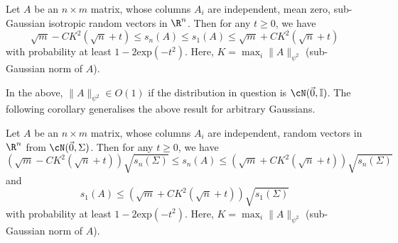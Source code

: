 \begin{lemma}\label{lem:sub-gaussian-spectrum}
    Let $A$ be an $n \times m$ matrix, whose columns $A_i$
    are independent, mean zero, sub-Gaussian isotropic
    random vectors in $\R^n$. Then for any $t \geq 0$,
    we have
    $$\sqrt{m} - CK^2(\sqrt{n}+t) \leq s_n(A) \leq
        s_1(A) \leq \sqrt{m} + CK^2(\sqrt{n}+t)$$
    with probability at least $1-2\mathrm{exp}(-t^2)$.
    Here, $K = \max_i\|A\|_{\psi^2}$ (sub-Gaussian norm
    of $A$).
\end{lemma}

In the above, $\|A\|_{\psi^2} \in O(1)$ if the distribution
in question is $\cN(\vec{0},\id)$. The following corollary
generalises the above result for arbitrary Gaussians.

\begin{corollary}\label{coro:normal-spectrum}
    Let $A$ be an $n \times m$ matrix, whose columns $A_i$
    are independent, random vectors in $\R^n$ from $\cN(\vec{0},\Sigma)$.
    Then for any $t \geq 0$, we have
    $$(\sqrt{m} - CK^2(\sqrt{n} + t))\sqrt{s_n(\Sigma)}
        \leq s_n(A) \leq (\sqrt{m} + CK^2(\sqrt{n} + t))\sqrt{s_n(\Sigma)}$$
    and
    $$s_1(A) \leq (\sqrt{m} + CK^2(\sqrt{n} + t))\sqrt{s_1(\Sigma)}$$
    with probability at least $1-2\mathrm{exp}(-t^2)$.
    Here, $K = \max_i\|A\|_{\psi^2}$ (sub-Gaussian norm
    of $A$).
\end{corollary}
